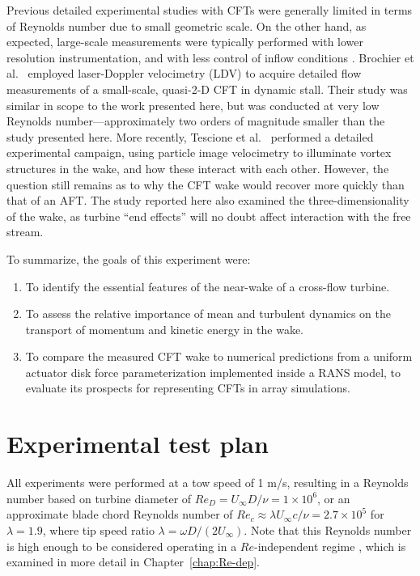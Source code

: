 Previous detailed experimental studies with CFTs were generally limited in terms
of Reynolds number due to small geometric scale. On the other hand, as expected,
large-scale measurements were typically performed with lower resolution
instrumentation, and with less control of inflow conditions
\cite{Vermeulen1979}. Brochier et al.~\cite{Brochier1986} employed laser-Doppler
velocimetry (LDV) to acquire detailed flow measurements of a small-scale,
quasi-2-D CFT in dynamic stall. Their study was similar in scope to the work
presented here, but was conducted at very low Reynolds number---approximately
two orders of magnitude smaller than the study presented here. More recently,
Tescione et al.~\cite{Tescione2014} performed a detailed experimental campaign,
using particle image velocimetry to illuminate vortex structures in the wake,
and how these interact with each other. However, the question still remains as
to why the CFT wake would recover more quickly than that of an AFT. The study
reported here also examined the three-dimensionality of the wake, as turbine
``end effects'' will no doubt affect interaction with the free stream.


To summarize, the goals of this experiment were:
\begin{enumerate}
    \item To identify the essential features of the near-wake of a cross-flow
    turbine.

    \item To assess the relative importance of mean and turbulent dynamics on the
    transport of momentum and kinetic energy in the wake.

    \item To compare the measured CFT wake to numerical predictions from a
    uniform actuator disk force parameterization implemented inside a RANS
    model, to evaluate its prospects for representing CFTs in array simulations.
\end{enumerate}


\section{Experimental test plan}

All experiments were performed at a tow speed of 1 m/s, resulting in a Reynolds
number based on turbine diameter of $Re_D = U_\infty D /\nu = 1 \times 10^6$, or
an approximate blade chord Reynolds number of $Re_c \approx \lambda U_\infty
c/\nu = 2.7 \times 10^5$ for $\lambda=1.9$, where tip speed ratio $\lambda
= \omega D / (2 U_\infty)$. Note that this Reynolds number is high enough
to be considered operating in a $Re$-independent regime \cite{Bravo2007,
    Bachant2014, Bachant2016-Energies}, which is examined in more detail in
Chapter~\ref{chap:Re-dep}.

